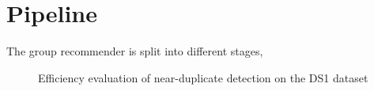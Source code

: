 \section{Pipeline}	\label{st:pipeline}
The group recommender is split into different stages, 

\begin{figure}
	\centering
	\caption{Efficiency evaluation of near-duplicate detection on the DS1 dataset \label{fig:neardup_performance}}
\end{figure}